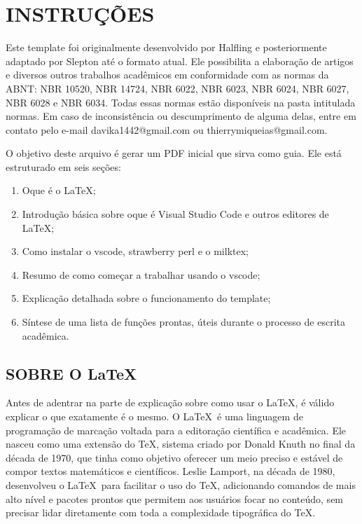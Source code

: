 \section{INSTRUÇÕES}

Este template foi originalmente desenvolvido por Halfling e posteriormente adaptado por Slepton até o formato atual. Ele possibilita a elaboração de artigos e diversos outros trabalhos acadêmicos em conformidade com as normas da ABNT: NBR 10520, NBR 14724, NBR 6022, NBR 6023, NBR 6024, NBR 6027, NBR 6028 e NBR 6034. Todas essas normas estão disponíveis na pasta intitulada normas. Em caso de inconsistência ou descumprimento de alguma delas, entre em contato pelo e-mail davika1442@gmail.com ou thierrymiqueias@gmail.com.

O objetivo deste arquivo é gerar um PDF inicial que sirva como guia. Ele está estruturado em seis seções:

\begin{enumerate}

\item Oque é o \LaTeX;

\item Introdução básica sobre oque é Visual Studio Code e outros editores de \LaTeX;

\item Como instalar o vscode, strawberry perl e o milktex;

\item Resumo de como começar a trabalhar usando o vscode;

\item Explicação detalhada sobre o funcionamento do template;

\item Síntese de uma lista de funções prontas, úteis durante o processo de escrita acadêmica.

\end{enumerate}

\subsection{SOBRE O \LaTeX}

Antes de adentrar na parte de explicação sobre como usar o \LaTeX, é válido explicar o que exatamente é o mesmo. O \LaTeX \ é uma linguagem de programação de marcação voltada para a editoração científica e acadêmica. Ele nasceu como uma extensão do TeX, sistema criado por Donald Knuth no final da década de 1970, que tinha como objetivo oferecer um meio preciso e estável de compor textos matemáticos e científicos. Leslie Lamport, na década de 1980, desenvolveu o \LaTeX \ para facilitar o uso do TeX, adicionando comandos de mais alto nível e pacotes prontos que permitem aos usuários focar no conteúdo, sem precisar lidar diretamente com toda a complexidade tipográfica do TeX.

